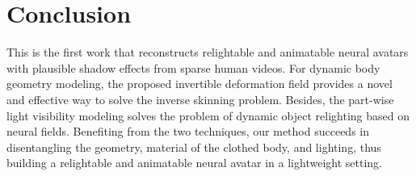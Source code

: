 \section{Conclusion}
This is the first work that reconstructs relightable and animatable neural avatars with plausible shadow effects from sparse human videos.
For dynamic body geometry modeling, the proposed invertible deformation field provides a novel and effective way to solve the inverse skinning problem.
Besides, the part-wise light visibility modeling solves the problem of dynamic object relighting based on neural fields.
Benefiting from the two techniques, our method succeeds in disentangling the geometry, material of the clothed body, and lighting, thus building a relightable and animatable neural avatar in a lightweight setting.

